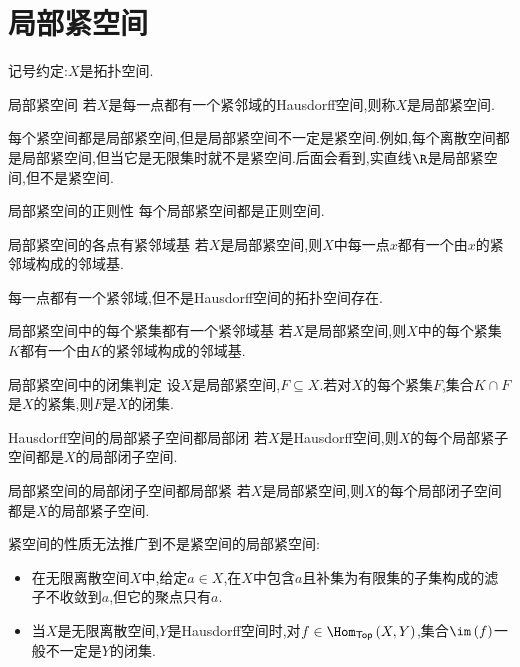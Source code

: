 \section{局部紧空间}

记号约定:$X$是拓扑空间.

\begin{definition}{局部紧空间}{}
	若$X$是每一点都有一个紧邻域的Hausdorff空间,则称$X$是局部紧空间.
\end{definition}

\begin{remark}{}{}
	每个紧空间都是局部紧空间,但是局部紧空间不一定是紧空间.例如,每个离散空间都是局部紧空间,但当它是无限集时就不是紧空间.后面会看到,实直线$\R$是局部紧空间,但不是紧空间.
\end{remark}

\begin{proposition}{局部紧空间的正则性}{}
	每个局部紧空间都是正则空间.
\end{proposition}

\begin{corollary}{局部紧空间的各点有紧邻域基}{}
	若$X$是局部紧空间,则$X$中每一点$x$都有一个由$x$的紧邻域构成的邻域基.
\end{corollary}

\begin{remark}{}{}
	每一点都有一个紧邻域,但不是Hausdorff空间的拓扑空间存在.
\end{remark}

\begin{proposition}{局部紧空间中的每个紧集都有一个紧邻域基}{}
	若$X$是局部紧空间,则$X$中的每个紧集$K$都有一个由$K$的紧邻域构成的邻域基.
\end{proposition}

\begin{proposition}{局部紧空间中的闭集判定}{}
	设$X$是局部紧空间,$F\subseteq X$.若对$X$的每个紧集$F$,集合$K\cap F$是$X$的紧集,则$F$是$X$的闭集.
\end{proposition}

\begin{proposition}{Hausdorff空间的局部紧子空间都局部闭}{}
	若$X$是Hausdorff空间,则$X$的每个局部紧子空间都是$X$的局部闭子空间.
\end{proposition}

\begin{proposition}{局部紧空间的局部闭子空间都局部紧}{}
	若$X$是局部紧空间,则$X$的每个局部闭子空间都是$X$的局部紧子空间.
\end{proposition}

\begin{remark}{}{}
	紧空间的性质无法推广到不是紧空间的局部紧空间:
	\begin{itemize}
		\item 在无限离散空间$X$中,给定$a\in X$,在$X$中包含$a$且补集为有限集的子集构成的滤子不收敛到$a$,但它的聚点只有$a$.
		\item 当$X$是无限离散空间,$Y$是Hausdorff空间时,对$f\in\Hom_{\mathsf{Top}}\left(X,Y\right)$,集合$\im\left(f\right)$一般不一定是$Y$的闭集.
	\end{itemize}
\end{remark}

